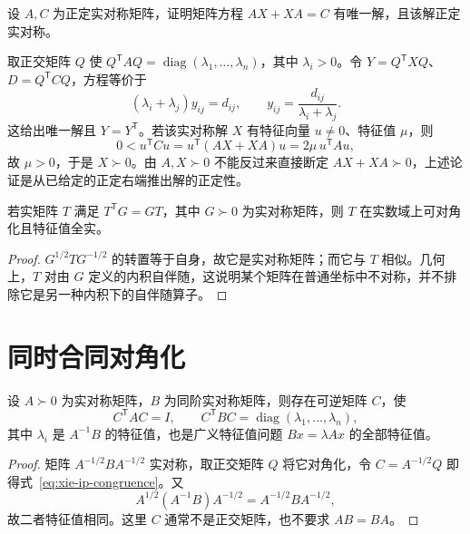 \begin{example}
设 $A,C$ 为正定实对称矩阵，证明矩阵方程 $AX+XA=C$ 有唯一解，且该解正定实对称。
\end{example}
\begin{solve}
取正交矩阵 $Q$ 使 $Q^{\mathsf T}AQ=\operatorname{diag}(\lambda_1,\ldots,\lambda_n)$，其中 $\lambda_i>0$。令 $Y=Q^{\mathsf T}XQ$、$D=Q^{\mathsf T}CQ$，方程等价于
\[
(\lambda_i+\lambda_j)y_{ij}=d_{ij},\qquad
 y_{ij}=\frac{d_{ij}}{\lambda_i+\lambda_j}.
\]
这给出唯一解且 $Y=Y^{\mathsf T}$。若该实对称解 $X$ 有特征向量 $u\ne0$、特征值 $\mu$，则
\[
0<u^{\mathsf T}Cu=u^{\mathsf T}(AX+XA)u
=2\mu\,u^{\mathsf T}Au,
\]
故 $\mu>0$，于是 $X\succ0$。由 $A,X\succ0$ 不能反过来直接断定 $AX+XA\succ0$，上述论证是从已给定的正定右端推出解的正定性。
\end{solve}

\begin{proposition}
若实矩阵 $T$ 满足 $T^{\mathsf T}G=GT$，其中 $G\succ0$ 为实对称矩阵，则 $T$ 在实数域上可对角化且特征值全实。
\end{proposition}
\begin{proof}
$G^{1/2}TG^{-1/2}$ 的转置等于自身，故它是实对称矩阵；而它与 $T$ 相似。几何上，$T$ 对由 $G$ 定义的内积自伴随，这说明某个矩阵在普通坐标中不对称，并不排除它是另一种内积下的自伴随算子。
\end{proof}

\section{同时合同对角化}
\label{sec:xie-ip-congruence}

\begin{theorem}
\label{thm:xie-ip-simultaneous-congruence}
设 $A\succ0$ 为实对称矩阵，$B$ 为同阶实对称矩阵，则存在可逆矩阵 $C$，使
\begin{equation}
\label{eq:xie-ip-congruence}
C^{\mathsf T}AC=I,\qquad C^{\mathsf T}BC=\operatorname{diag}(\lambda_1,\ldots,\lambda_n),
\end{equation}
其中 $\lambda_i$ 是 $A^{-1}B$ 的特征值，也是广义特征值问题 $Bx=\lambda Ax$ 的全部特征值。
\end{theorem}
\begin{proof}
矩阵 $A^{-1/2}BA^{-1/2}$ 实对称，取正交矩阵 $Q$ 将它对角化，令 $C=A^{-1/2}Q$ 即得式~\eqref{eq:xie-ip-congruence}。又
\[
A^{1/2}(A^{-1}B)A^{-1/2}=A^{-1/2}BA^{-1/2},
\]
故二者特征值相同。这里 $C$ 通常不是正交矩阵，也不要求 $AB=BA$。
\end{proof}

